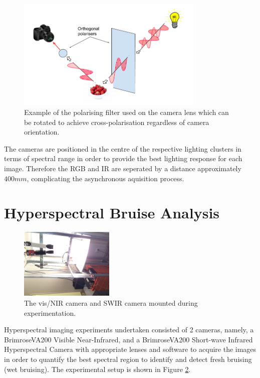 \documentclass[fleqn,twoside,12pt]{report}
\begin{document}
\begin{figure}[h]
	\centering
	\includegraphics[width=0.8\textwidth]{cross-polariser.png}
	\caption{Example of the polarising filter used on the camera lens which can be rotated to achieve cross-polarisation regardless of camera orientation.}
	\label{fig:nd_filters}
\end{figure}

The cameras are positioned in the centre of the respective lighting clusters in terms of spectral range in order to provide the best lighting response for each image. Therefore the RGB and IR are seperated by a distance approximately $400mm$, complicating the asynchronous aquisition process.




\section{Hyperspectral Bruise Analysis}



\begin{figure}
	\begin{center}
		\includegraphics[width=0.4\textwidth,angle=270]{HSI.jpg}
	\end{center}
	\caption{The vis/NIR camera and SWIR camera mounted during experimentation.}
	\label{fig:HSI}
\end{figure} 

Hyperspectral imaging experiments undertaken consisted of 2 cameras, namely, a Brimrose\textregistered VA200 Visible Near-Infrared, and a Brimrose\textregistered VA200 Short-wave Infrared Hyperspectral Camera with appropriate lenses and software to acquire the images in order to quantify the best spectral region to identify and detect fresh bruising (wet bruising). The experimental setup is shown in Figure \ref{fig:HSI}.
\end{document}
